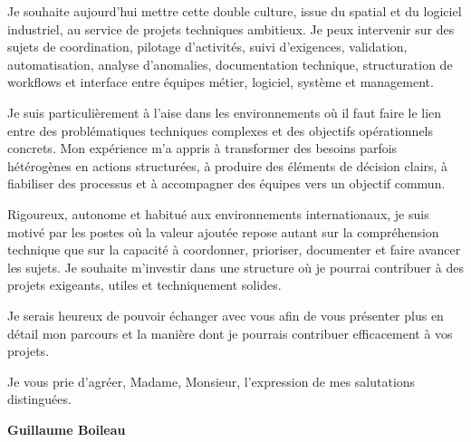 \documentclass[11pt,a4paper]{../_shared/altacv}
\begin{document}
{Je souhaite aujourd'hui mettre cette double culture, issue du spatial et du logiciel industriel, au service de projets techniques ambitieux. Je peux intervenir sur des sujets de coordination, pilotage d'activités, suivi d'exigences, validation, automatisation, analyse d'anomalies, documentation technique, structuration de workflows et interface entre équipes métier, logiciel, système et management.

Je suis particulièrement à l'aise dans les environnements où il faut faire le lien entre des problématiques techniques complexes et des objectifs opérationnels concrets. Mon expérience m'a appris à transformer des besoins parfois hétérogènes en actions structurées, à produire des éléments de décision clairs, à fiabiliser des processus et à accompagner des équipes vers un objectif commun.

Rigoureux, autonome et habitué aux environnements internationaux, je suis motivé par les postes où la valeur ajoutée repose autant sur la compréhension technique que sur la capacité à coordonner, prioriser, documenter et faire avancer les sujets. Je souhaite m'investir dans une structure où je pourrai contribuer à des projets exigeants, utiles et techniquement solides.

Je serais heureux de pouvoir échanger avec vous afin de vous présenter plus en détail mon parcours et la manière dont je pourrais contribuer efficacement à vos projets.

Je vous prie d'agréer, Madame, Monsieur, l'expression de mes salutations distinguées.

\textbf{Guillaume Boileau}

}
\end{document}

